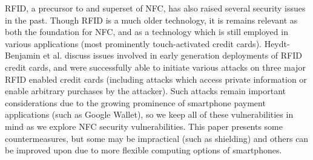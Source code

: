 \documentclass[12pt]{article}
\begin{document}
RFID, a precursor to and superset of NFC, has also raised several security issues in the past.
Though RFID is a much older technology, it is remains relevant as both the foundation for NFC, and as a technology which is still employed in various applications (most prominently touch-activated credit cards).
Heydt-Benjamin et al.\cite{heydtbenjamin2007} discuss issues involved in early generation deployments of RFID credit cards, and were successfully able to initiate various attacks on three major RFID enabled credit cards (including attacks which access private information or enable arbitrary purchases by the attacker).
Such attacks remain important considerations due to the growing prominence of smartphone payment applications  (such as Google Wallet), so we keep all of these vulnerabilities in mind as we explore NFC security vulnerabilities.
This paper presents some countermeasures, but some may be impractical (such as shielding) and others can be improved upon due to more flexible computing options of smartphones.
%
%
%
\end{document}

